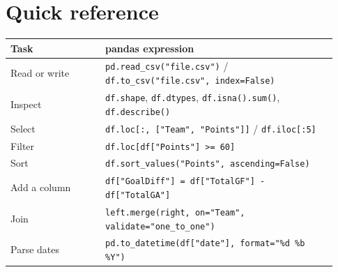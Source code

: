 \documentclass[11pt,letterpaper]{article}
\begin{document}
\section*{Quick reference}
\small
\begin{center}
\begin{tabular}{@{}p{0.27\linewidth}p{0.66\linewidth}@{}}
\toprule
Task & pandas expression \\
\midrule
Read or write & \texttt{pd.read\_csv("file.csv")} / \texttt{df.to\_csv("file.csv", index=False)} \\
Inspect & \texttt{df.shape}, \texttt{df.dtypes}, \texttt{df.isna().sum()}, \texttt{df.describe()} \\
Select & \texttt{df.loc[:, ["Team", "Points"]]} / \texttt{df.iloc[:5]} \\
Filter & \texttt{df.loc[df["Points"] >= 60]} \\
Sort & \texttt{df.sort\_values("Points", ascending=False)} \\
Add a column & \texttt{df["GoalDiff"] = df["TotalGF"] - df["TotalGA"]} \\
Join & \texttt{left.merge(right, on="Team", validate="one\_to\_one")} \\
Parse dates & \texttt{pd.to\_datetime(df["date"], format="\%d \%b \%Y")} \\
\bottomrule
\end{tabular}
\end{center}
\normalsize
\end{document}
